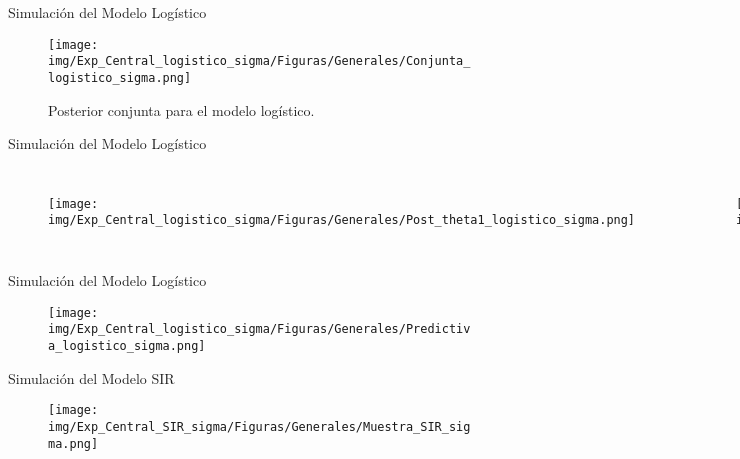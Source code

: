 \documentclass[10pt,aspectratio=169]{beamer}
\begin{document}
\begin{frame}{Simulación del Modelo Logístico}
  \begin{figure}
    \centering 
    \texttt{[image: img/Exp\_Central\_logistico\_sigma/Figuras/Generales/Conjunta\_logistico\_sigma.png]} 
    \caption{Posterior conjunta para el modelo logístico.}
    \label{Fig. 3.2.log.conjunta}
  \end{figure} 
\end{frame}


\begin{frame}{Simulación del Modelo Logístico}
  \begin{columns}[T,onlytextwidth]
    
    \begin{figure}
      \centering 
      \texttt{[image: img/Exp\_Central\_logistico\_sigma/Figuras/Generales/Post\_theta1\_logistico\_sigma.png]}
    \end{figure} 
    
    
      
    \begin{figure}
      \centering 
      \texttt{[image: img/Exp\_Central\_logistico\_sigma/Figuras/Generales/Post\_theta2\_logistico\_sigma.png]}
    \end{figure} 
    
  \end{columns}
\end{frame}


\begin{frame}{Simulación del Modelo Logístico}
  \begin{figure}
    \centering 
    \texttt{[image: img/Exp\_Central\_logistico\_sigma/Figuras/Generales/Predictiva\_logistico\_sigma.png]} 
    \label{Fig. 3.2.log.predictiva}
  \end{figure} 
\end{frame}


\begin{frame}{Simulación del Modelo SIR}
  \begin{figure}
    \centering 
    \texttt{[image: img/Exp\_Central\_SIR\_sigma/Figuras/Generales/Muestra\_SIR\_sigma.png]} 
    \label{Fig. SIR_01}
  \end{figure} 
\end{frame}
\end{document}
